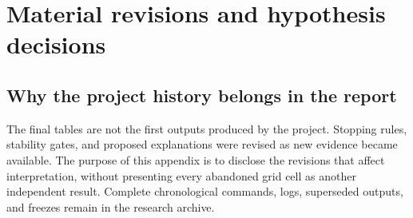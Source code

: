 \section{Material revisions and hypothesis decisions}
\label{app:history}
\subsection{Why the project history belongs in the report}
The final tables are not the first outputs produced by the project.
Stopping rules, stability gates, and proposed explanations were revised as
new evidence became available. The purpose of this appendix is to disclose
the revisions that affect interpretation, without presenting every abandoned
grid cell as another independent result. Complete chronological commands,
logs, superseded outputs, and freezes remain in the research archive.

